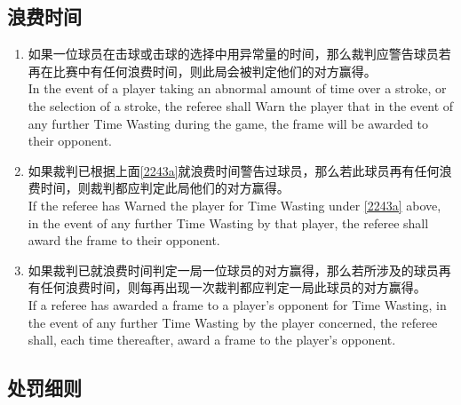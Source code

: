 \subsection{浪费时间}\label{2243}

\begin{enumerate}[label=(\alph*)]
    \item \label{2243a}如果一位球员在击球或击球的选择中用异常量的时间，那么裁判应警告球员若再在比赛中有任何浪费时间，则此局会被判定他们的对方赢得。\\
    In the event of a player taking an abnormal amount of time over a stroke, or the selection of a stroke, the referee shall Warn the player that in the event of any further Time Wasting during the game, the frame will be awarded to their opponent.
    \item \label{2243b}如果裁判已根据上面\ref{2243a}就浪费时间警告过球员，那么若此球员再有任何浪费时间，则裁判都应判定此局他们的对方赢得。\\
    If the referee has Warned the player for Time Wasting under \ref{2243a} above, in the event of any further Time Wasting by that player, the referee shall award the frame to their opponent.
    \item \label{2243c}如果裁判已就浪费时间判定一局一位球员的对方赢得，那么若所涉及的球员再有任何浪费时间，则每再出现一次裁判都应判定一局此球员的对方赢得。\\
    If a referee has awarded a frame to a player's opponent for Time Wasting, in the event of any further Time Wasting by the player concerned, the referee shall, each time thereafter, award a frame to the player's opponent.
\end{enumerate}

\subsection{处罚细则}

